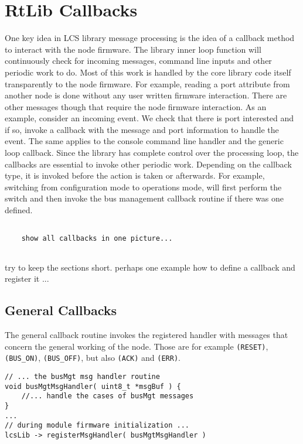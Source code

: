 \chapter{RtLib Callbacks}

One key idea in LCS library message processing is the idea of a callback method to interact with the node firmware. The library inner loop function will continuously check for incoming messages, command line inputs and other periodic work to do. Most of this work is handled by the core library code itself transparently to the node firmware. For example, reading a port attribute from another node is done without any user written firmware interaction. There are other messages though that require the node firmware interaction. As an example, consider an incoming event. We check that there is port interested and if so, invoke a callback with the message and port information to handle the event. The same applies to the console command line handler and the generic loop callback. Since the library has complete control over the processing loop, the callbacks are essential to invoke other periodic work. Depending on the callback type, it is invoked before the action is taken or afterwards. For example, switching from configuration mode to operations mode, will first perform the switch and then invoke the bus management callback routine if there was one defined.

\lstset{language=c++, style=codesnippetstyle}
\begin{lstlisting}
   
    show all callbacks in one picture...
    
\end{lstlisting}

try to keep the sections short. perhaps one example how to define a callback and register it ...

\section{General Callbacks}

The general callback routine invokes the registered handler with messages that concern the general working of the node. Those are for example \texttt{(RESET)}, \texttt{(BUS\_ON)}, \texttt{(BUS\_OFF)}, but also \texttt{(ACK)} and \texttt{(ERR)}.

\lstset{style=codesnippetstyle}
\begin{lstlisting}
// ... the busMgt msg handler routine
void busMgtMsgHandler( uint8_t *msgBuf ) {
	//... handle the cases of busMgt messages
}
...
// during module firmware initialization ...
lcsLib -> registerMsgHandler( busMgtMsgHandler )
\end{lstlisting}

